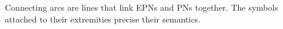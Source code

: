 Connecting arcs are lines that link EPNs and PNs together. The symbols attached to their extremities precise their semantics.
 
% 
% 
% 
% 
% 
% 
% 
% 
% 



% 
% 
% 
% 
% 
% 




